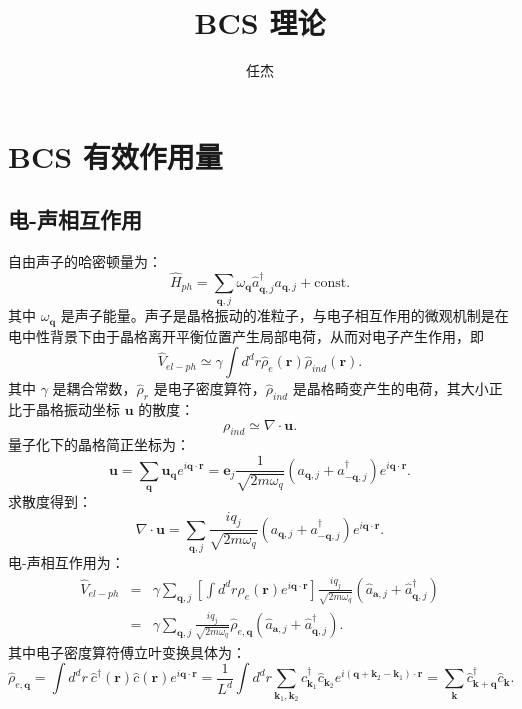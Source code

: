 \documentclass[10pt,UTF8]{ctexart}
\begin{document}
\title{BCS 理论}
\author{任杰}
\date{}

\maketitle


\section*{BCS 有效作用量}
\subsection*{电-声相互作用}
\noindent 自由声子的哈密顿量为：
\begin{equation}
	\hat H_{ph} = \sum_{\bm q, j} \omega_{\bm q}\hat a^\dagger_{\bm q, j} a_{\bm q, j} + \mathrm{const}.
\end{equation}
其中 $\omega_{\bm q}$ 是声子能量。声子是晶格振动的准粒子，与电子相互作用的微观机制是在电中性背景下由于晶格离开平衡位置产生局部电荷，从而对电子产生作用，即
\begin{equation}
	\hat V_{el-ph} \simeq \gamma \int d^d r \hat\rho_e(\bm r) \hat\rho_{ind}(\bm r).
\end{equation}
其中 $\gamma$ 是耦合常数，$\hat\rho_r$ 是电子密度算符，$\hat \rho_{ind}$ 是晶格畸变产生的电荷，其大小正比于晶格振动坐标 $\bm u$ 的散度：
\begin{equation}
	\rho_{ind} \simeq \nabla \cdot \bm u.
\end{equation}
量子化下的晶格简正坐标为：
\begin{equation}
	\bm u 
	= \sum_{\bm q} \bm u_{\bm q} e^{i\bm q \cdot \bm r}
	=\bm e_j \frac{1}{\sqrt{2m\omega_q}} (a_{\bm q,j}+a_{-\bm q,j}^\dagger) e^{i\bm q \cdot \bm r}.
\end{equation}
求散度得到：
\begin{equation}
	\nabla \cdot \bm u  
	= \sum_{\bm q,j} \frac{iq_j}{\sqrt{2m\omega_q}} (a_{\bm q,j}+a_{-\bm q,j}^\dagger) e^{i \bm q \cdot \bm r}. 
\end{equation}
电-声相互作用为：
\begin{eqnarray}
	\hat V_{el-ph} 
	&=& \gamma \sum_{\bm q,j} \left[ \int d^d r \hat \rho_e(\bm r) e^{i\bm q\cdot \bm r} \right] \frac{iq_j}{\sqrt{2m\omega_q}} \left( \hat a_{\bm a,j}+\hat a^\dagger_{\bm q,j} \right) \nonumber \\
	&=& \gamma \sum_{\bm q,j} \frac{iq_j}{\sqrt{2m\omega_q}} \hat \rho_{e,\bm q} \left( \hat a_{\bm a,j}+\hat a^\dagger_{\bm q,j} \right).
\end{eqnarray}
其中电子密度算符傅立叶变换具体为：
\begin{equation}
	\hat \rho_{e,\bm q} 
	= \int d^d r \ \hat c^\dagger(\bm r) \hat c(\bm r)e^{i \bm q \cdot \bm r}
	= \frac{1}{L^d} \int d^d r \sum_{\bm k_1, \bm k_2} \hat c^\dagger_{\bm k_1} \hat c_{\bm k_2} e^{i (\bm q + \bm k_2 - \bm k_1)\cdot \bm r}
	= \sum_{\bm k} \hat c^\dagger_{\bm k+\bm q} \hat c_{\bm k}.
\end{equation}
\end{document}
